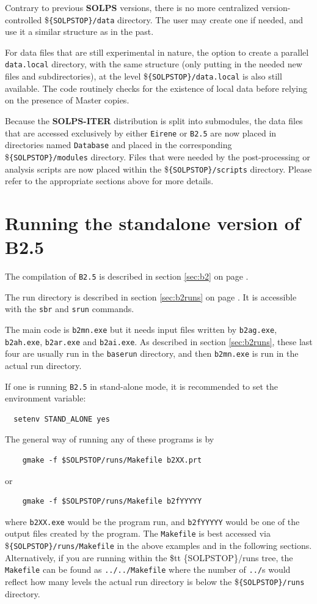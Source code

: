 \documentclass[a4paper,10pt]{report}
\newcommand\SOLPSITER{{\bf SOLPS-ITER} }
\begin{document}
Contrary to previous {\bf SOLPS} versions, there is no more centralized
version-controlled \${\tt \{SOLPSTOP\}/data} directory. The user may create
one if needed, and use it a similar structure as in the past.

For data files that are still experimental in nature, the option
to create a parallel {\tt data.local} directory, with
the same structure (only putting in the needed new files and subdirectories),
at the level \${\tt \{SOLPSTOP\}/data.local} is also still available.
The code routinely checks for
the existence of local data before relying on the presence of Master copies.

Because the \SOLPSITER distribution is split into submodules, the data files
that are accessed exclusively by either {\tt Eirene} or {\tt B2.5} are now
placed in directories named {\tt Database} and placed in the corresponding
\${\tt \{SOLPSTOP\}/modules} directory. Files that were needed by the
post-processing or analysis scripts are now placed within the
\${\tt \{SOLPSTOP\}/scripts} directory. Please refer to the appropriate sections
above for more details.

\chapter{Running the standalone version of B2.5}
\label{cha:standaloneb2}

The compilation of {\tt B2.5} is described in section \ref{sec:b2} on page
\pageref{sec:b2}.

The run directory is described in section \ref{sec:b2runs} on page
\pageref{sec:b2runs}. It is accessible with the {\tt sbr} and {\tt srun} commands.

The main code is {\tt b2mn.exe} but it needs input files written
by {\tt b2ag.exe}, {\tt b2ah.exe}, {\tt b2ar.exe} and
{\tt b2ai.exe}.  As described in section \ref{sec:b2runs}, these last four are
usually run in the {\tt baserun} directory, and then {\tt b2mn.exe}
is run in the actual run directory.

If one is running {\tt B2.5} in stand-alone mode, it is recommended to set the environment variable:
\begin{verbatim}
  setenv STAND_ALONE yes
\end{verbatim}

The general way of running any of these programs is by
\begin{verbatim}
    gmake -f $SOLPSTOP/runs/Makefile b2XX.prt
\end{verbatim}
or
\begin{verbatim}
    gmake -f $SOLPSTOP/runs/Makefile b2fYYYYY
\end{verbatim}
where {\tt b2XX.exe} would be the program run, and {\tt b2fYYYYY}
would be one of the output files created by the program. The {\tt Makefile}
is best accessed via \${\tt \{SOLPSTOP\}/runs/Makefile} in the
above examples and in the following sections. Alternatively, if you are
running within the \${tt \{SOLPSTOP\}/runs} tree, the
{\tt Makefile} can be found as {\tt ../../Makefile} where the number
of {\tt ../}s would reflect how many
levels the actual run directory is below the
\${\tt \{SOLPSTOP\}/runs} directory.
\end{document}
